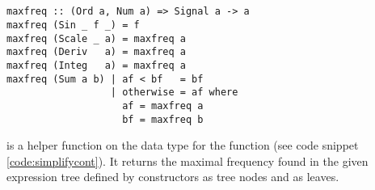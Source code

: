 \subsection{}\label{sec:appcodemaxfreq}
\begin{codefig}
\begin{verbatim}
maxfreq :: (Ord a, Num a) => Signal a -> a
maxfreq (Sin _ f _) = f
maxfreq (Scale _ a) = maxfreq a
maxfreq (Deriv   a) = maxfreq a
maxfreq (Integ   a) = maxfreq a
maxfreq (Sum a b) | af < bf   = bf
                  | otherwise = af where
                    af = maxfreq a
                    bf = maxfreq b
\end{verbatim}
\caption{ is a helper function on the  data type for the function  (see code snippet \ref{code:simplifycont}). It returns the maximal frequency found in the given  expression tree defined by  constructors as tree nodes and  as leaves.}
\end{codefig}
